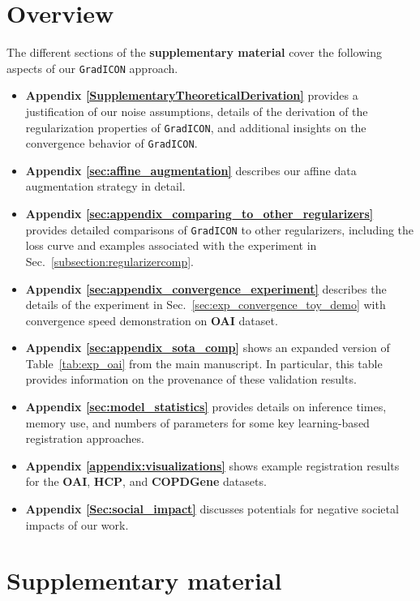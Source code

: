 \newpage
\clearpage
\section*{Overview}
The different sections of the \textbf{supplementary material} cover the following aspects of our \texttt{GradICON} approach.
\begin{itemize}
	\item {\bf Appendix \ref{SupplementaryTheoreticalDerivation}} provides a justification of our noise assumptions, details of the derivation of the regularization properties of \texttt{GradICON}, and additional insights on the convergence behavior of \texttt{GradICON}.
	\item {\bf Appendix \ref{sec:affine_augmentation}} describes our affine data augmentation strategy in detail.
	\item {\bf Appendix \ref{sec:appendix_comparing_to_other_regularizers}} provides detailed comparisons of \texttt{GradICON} to other regularizers, including the loss curve and examples associated with the experiment in Sec.~\ref{subsection:regularizercomp}.
	\item {\bf Appendix \ref{sec:appendix_convergence_experiment}} describes the details of the experiment in Sec.~\ref{sec:exp_convergence_toy_demo} with convergence speed demonstration on \textbf{OAI} dataset.
	\item {\bf Appendix \ref{sec:appendix_sota_comp}} shows an expanded version of Table~\ref{tab:exp_oai} from the main manuscript. In particular, this table provides information on the provenance of these validation results.
	\item {\bf Appendix \ref{sec:model_statistics}} provides details on inference times, memory use, and numbers of parameters for some key learning-based registration approaches.
	\item {\bf Appendix \ref{appendix:visualizations}} shows example registration results for the \textbf{OAI}, \textbf{HCP}, and \textbf{COPDGene} datasets.
	\item {\bf Appendix \ref{Sec:social_impact}} discusses potentials for negative societal impacts of our work.
\end{itemize}
\section{Supplementary material}
